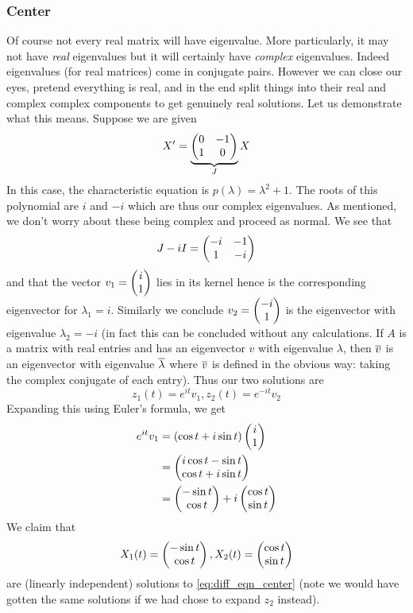 \subsubsection{Center}
Of course not every real matrix will have eigenvalue. More particularly, it may not have \textit{real} eigenvalues but it will certainly have \textit{complex} eigenvalues. Indeed eigenvalues (for real matrices) come in conjugate pairs. However we can close our eyes, pretend everything is real, and in the end split things into their real and complex complex components to get genuinely real solutions. Let us demonstrate what this means. Suppose we are given
\begin{equation}\label{eq:diff_eqn_center}
    X' = \underbrace{\begin{pmatrix} 0 & -1\\1 & 0 \end{pmatrix}}_{J} X
\end{equation}
In this case, the characteristic equation is $p(\lambda) = \lambda^2 + 1$. The roots of this polynomial are $i$ and $-i$ which are thus our complex eigenvalues. As mentioned, we don't worry about these being complex and proceed as normal. We see that
\begin{align*}
    J - iI = \begin{pmatrix} -i & -1\\1 & -i \end{pmatrix}
\end{align*}
and that the vector $v_1 = \begin{pmatrix} i \\ 1 \end{pmatrix}$ lies in its kernel hence is the corresponding eigenvector for $\lambda_1 = i$. Similarly we conclude $v_2 = \begin{pmatrix} -i \\ 1 \end{pmatrix}$ is the eigenvector with eigenvalue $\lambda_2 = -i$ (in fact this can be concluded without any calculations. If $A$ is a matrix with real entries and has an eigenvector $v$ with eigenvalue $\lambda$, then $\overline{v}$ is an eigenvector with eigenvalue $\overline{\lambda}$ where $\overline{v}$ is defined in the obvious way: taking the complex conjugate of each entry). Thus our two solutions are
$$ z_1(t) = e^{it} v_1, z_2(t) = e^{-it} v_2  $$
Expanding this using Euler's formula, we get
\begin{align*}
    e^{it} v_1 &= (\cos t + i \sin t) \begin{pmatrix} i\\1 \end{pmatrix}\\
    &= \begin{pmatrix} i \cos t - \sin t  \\ \cos t + i \sin t \end{pmatrix}\\
    &= \begin{pmatrix} -\sin t \\ \cos t \end{pmatrix} + i \begin{pmatrix} \cos t \\ \sin t \end{pmatrix}
\end{align*}
We claim that
$$X_1(t) = \begin{pmatrix} -\sin t \\ \cos t \end{pmatrix}, X_2(t) = \begin{pmatrix} \cos t \\ \sin t \end{pmatrix}$$
are (linearly independent) solutions to \autoref{eq:diff_eqn_center} (note we would have gotten the same solutions if we had chose to expand $z_2$ instead).

